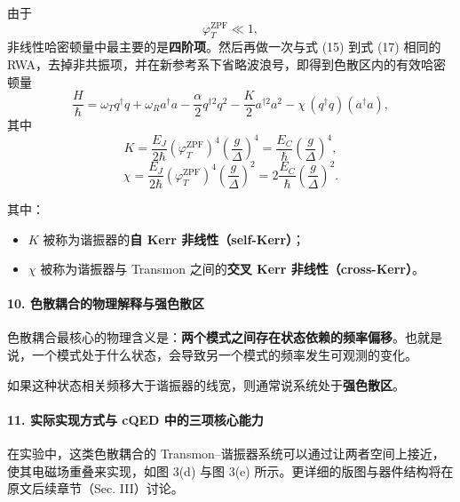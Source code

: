 \documentclass[12pt,a4paper,oneside]{ctexbook}
\begin{document}
由于
\[
    \varphi_T^{\mathrm{ZPF}}\ll 1,
\]
非线性哈密顿量中最主要的是\textbf{四阶项}。然后再做一次与式 (15) 到式 (17) 相同的 RWA，去掉非共振项，并在新参考系下省略波浪号，即得到色散区内的有效哈密顿量
\begin{equation}
    \frac{H}{\hbar}
    =
    \omega_T q^\dagger q
    +
    \omega_R a^\dagger a
    -
    \frac{\alpha}{2}q^{\dagger 2}q^2
    -
    \frac{K}{2}a^{\dagger 2}a^2
    -
    \chi\,(q^\dagger q)(a^\dagger a),
    \tag{33}
\end{equation}
其中
\begin{equation}
    K
    =
    \frac{E_J}{2\hbar}
    \left(\varphi_T^{\mathrm{ZPF}}\right)^4
    \left(\frac{g}{\Delta}\right)^4
    =
    \frac{E_C}{\hbar}\left(\frac{g}{\Delta}\right)^4,
    \tag{34}
\end{equation}
\begin{equation}
    \chi
    =
    \frac{E_J}{2\hbar}
    \left(\varphi_T^{\mathrm{ZPF}}\right)^4
    \left(\frac{g}{\Delta}\right)^2
    =
    2\frac{E_C}{\hbar}\left(\frac{g}{\Delta}\right)^2.
    \tag{35}
\end{equation}

其中：
\begin{itemize}[leftmargin=2em]
    \item \(K\) 被称为谐振器的\textbf{自 Kerr 非线性（self-Kerr）}；
    \item \(\chi\) 被称为谐振器与 Transmon 之间的\textbf{交叉 Kerr 非线性（cross-Kerr）}。
\end{itemize}

\paragraph{10. 色散耦合的物理解释与强色散区}

色散耦合最核心的物理含义是：\textbf{两个模式之间存在状态依赖的频率偏移}。也就是说，一个模式处于什么状态，会导致另一个模式的频率发生可观测的变化。

如果这种状态相关频移大于谐振器的线宽，则通常说系统处于\textbf{强色散区}。

\paragraph{11. 实际实现方式与 cQED 中的三项核心能力}

在实验中，这类色散耦合的 Transmon--谐振器系统可以通过让两者空间上接近，使其电磁场重叠来实现，如图 3(d) 与图 3(e) 所示。更详细的版图与器件结构将在原文后续章节（Sec. III）讨论。
\end{document}
